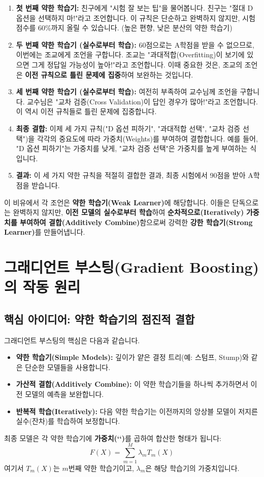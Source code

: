 \documentclass[11pt,a4paper]{article}
\begin{document}
\begin{examplebox}[시험 통과 비유]
\begin{enumerate}
    \item \textbf{첫 번째 약한 학습기:} 친구에게 "시험 잘 보는 팁"을 물어봅니다. 친구는 "절대 D 옵션을 선택하지 마!"라고 조언합니다. 이 규칙은 단순하고 완벽하지 않지만, 시험 점수를 60\%까지 올릴 수 있습니다. (높은 편향, 낮은 분산의 약한 학습기)
    \item \textbf{두 번째 약한 학습기 (실수로부터 학습):} 60점으로는 A학점을 받을 수 없으므로, 이번에는 조교에게 조언을 구합니다. 조교는 "과대적합(Overfitting)이 보기에 있으면 그게 정답일 가능성이 높아!"라고 조언합니다. 이때 중요한 것은, 조교의 조언은 \textbf{이전 규칙으로 틀린 문제에 집중}하여 보완하는 것입니다.
    \item \textbf{세 번째 약한 학습기 (실수로부터 학습):} 여전히 부족하여 교수님께 조언을 구합니다. 교수님은 "교차 검증(Cross Validation)이 답인 경우가 많아!"라고 조언합니다. 이 역시 이전 규칙들로 틀린 문제에 집중합니다.
    \item \textbf{최종 결합:} 이제 세 가지 규칙("D 옵션 피하기", "과대적합 선택", "교차 검증 선택")을 각각의 중요도에 따라 가중치(Weights)를 부여하여 결합합니다. 예를 들어, "D 옵션 피하기"는 가중치를 낮게, "교차 검증 선택"은 가중치를 높게 부여하는 식입니다.
    \item \textbf{결과:} 이 세 가지 약한 규칙을 적절히 결합한 결과, 최종 시험에서 90점을 받아 A학점을 받습니다.
\end{enumerate}
\end{examplebox}

이 비유에서 각 조언은 \textbf{약한 학습기(Weak Learner)}에 해당합니다. 이들은 단독으로는 완벽하지 않지만, \textbf{이전 모델의 실수로부터 학습}하여 \textbf{순차적으로(Iteratively)} \textbf{가중치를 부여하여 결합(Additively Combine)}함으로써 강력한 \textbf{강한 학습기(Strong Learner)}를 만들어냅니다.

\newpage
\section{그래디언트 부스팅(Gradient Boosting)의 작동 원리}

\subsection{핵심 아이디어: 약한 학습기의 점진적 결합}
그래디언트 부스팅의 핵심은 다음과 같습니다.
\begin{itemize}
    \item \textbf{약한 학습기(Simple Models):} 깊이가 얕은 결정 트리(예: 스텀프, Stump)와 같은 단순한 모델들을 사용합니다.
    \item \textbf{가산적 결합(Additively Combine):} 이 약한 학습기들을 하나씩 추가하면서 이전 모델의 예측을 보완합니다.
    \item \textbf{반복적 학습(Iteratively):} 다음 약한 학습기는 이전까지의 앙상블 모델이 저지른 실수(잔차)를 학습하여 보정합니다.
\end{itemize}
최종 모델은 각 약한 학습기에 \textbf{가중치(`\lambda`)}를 곱하여 합산한 형태가 됩니다:
\[ F(X) = \sum_{m=1}^{M} \lambda_m T_m(X) \]
여기서 $T_m(X)$는 $m$번째 약한 학습기이고, $\lambda_m$은 해당 학습기의 가중치입니다.
\end{document}
